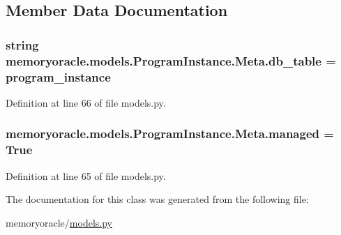 \subsection{Member Data Documentation}
\hypertarget{classmemoryoracle_1_1models_1_1ProgramInstance_1_1Meta_a307135b242797eec23578567cd518b1d}{}
\subsubsection[{db\+\_\+table}]{\setlength{\rightskip}{0pt plus 5cm}string memoryoracle.\+models.\+Program\+Instance.\+Meta.\+db\+\_\+table = \textquotesingle{}program\+\_\+instance\textquotesingle{}\hspace{0.3cm}{\ttfamily [static]}}\label{classmemoryoracle_1_1models_1_1ProgramInstance_1_1Meta_a307135b242797eec23578567cd518b1d}


Definition at line 66 of file models.\+py.

\hypertarget{classmemoryoracle_1_1models_1_1ProgramInstance_1_1Meta_a73845fb87f4712a15e46ca9bbafbefd6}{}
\subsubsection[{managed}]{\setlength{\rightskip}{0pt plus 5cm}memoryoracle.\+models.\+Program\+Instance.\+Meta.\+managed = True\hspace{0.3cm}{\ttfamily [static]}}\label{classmemoryoracle_1_1models_1_1ProgramInstance_1_1Meta_a73845fb87f4712a15e46ca9bbafbefd6}


Definition at line 65 of file models.\+py.



The documentation for this class was generated from the following file\+:\begin{DoxyCompactItemize}
\item 
memoryoracle/\hyperlink{models_8py}{models.\+py}\end{DoxyCompactItemize}
